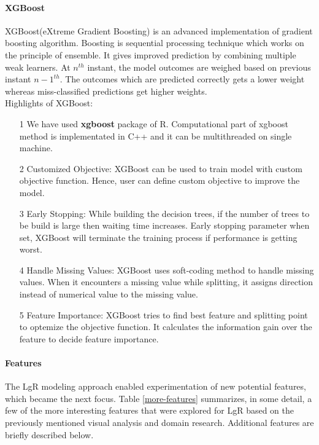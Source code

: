 \documentclass[fleqn,10pt]{SelfArx} %
\begin{document}
\paragraph{XGBoost}
XGBoost(eXtreme Gradient Boosting) is an advanced implementation of gradient boosting algorithm. Boosting is sequential processing technique which works on the principle of ensemble. It gives improved prediction by combining multiple weak learners. At $n^{th}$ instant, the model outcomes are weighed based on previous instant $n-1^{th}$. The outcomes which are predicted correctly gets a lower weight whereas miss-classified predictions get higher weights.\\
Highlights of XGBoost:
\begin{itemize}
	\item[1] We have used \textbf{xgboost} package of R. Computational part of xgboost method is implementated in C++ and it can be multithreaded on single machine.
	\item[2] Customized Objective: XGBoost can be used to train model with custom objective function. Hence, user can define custom objective to improve the model.
	\item[3] Early Stopping: While building the decision trees, if the number of trees to be build is large then waiting time increases. Early stopping parameter when set, XGBoost will terminate the training process if performance is getting worst.  
	\item[4] Handle Missing Values: XGBoost uses soft-coding method to handle missing values. When it encounters a missing value while splitting, it assigns direction instead of numerical value to the missing value.
	\item[5] Feature Importance: XGBoost tries to find best feature and splitting point to optemize the objective function. It calculates the information gain over the feature to decide feature importance.
\end{itemize}

\paragraph{Features} The LgR modeling approach enabled experimentation of new potential features, which became the next focus.  Table \ref{more-features} summarizes, in some detail, a few of the more interesting features that were explored for LgR based on the previously mentioned visual analysis and domain research.  Additional features are briefly described below.
\end{document}

